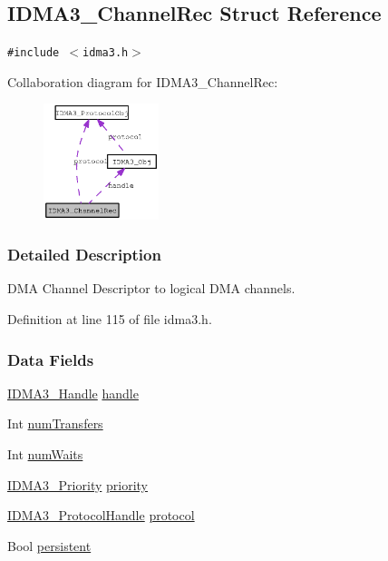 \hypertarget{struct_i_d_m_a3___channel_rec}{
\subsection{IDMA3\_\-Channel\-Rec Struct Reference}
\label{struct_i_d_m_a3___channel_rec}
}
{\tt \#include $<$idma3.h$>$}

Collaboration diagram for IDMA3\_\-Channel\-Rec:\begin{figure}[H]
\begin{center}
\leavevmode
\includegraphics[width=95pt]{struct_i_d_m_a3___channel_rec__coll__graph}
\end{center}
\end{figure}


\subsubsection{Detailed Description}
DMA Channel Descriptor to logical DMA channels. 



Definition at line 115 of file idma3.h.\subsubsection*{Data Fields}
\begin{CompactItemize}
\item 
\hyperlink{struct_i_d_m_a3___obj}{IDMA3\_\-Handle} \hyperlink{struct_i_d_m_a3___channel_rec_5632bb9719d49836987e3b4ae9b3d692}{handle}
\item 
Int \hyperlink{struct_i_d_m_a3___channel_rec_725990b773355d1dfd5fc9af66179d22}{num\-Transfers}
\item 
Int \hyperlink{struct_i_d_m_a3___channel_rec_9be5abbc86b57d28e1d65cc6ea1ed294}{num\-Waits}
\item 
\hyperlink{group___d_s_p_i_d_m_a3_gfa41dccd2cc8f94915fffdda2c8b4a59}{IDMA3\_\-Priority} \hyperlink{struct_i_d_m_a3___channel_rec_e8b3740a842ad7ebb28cecf135f0c88f}{priority}
\item 
\hyperlink{struct_i_d_m_a3___protocol_obj}{IDMA3\_\-Protocol\-Handle} \hyperlink{struct_i_d_m_a3___channel_rec_a7a4ff7549fd7be65a22cba0b8d50fad}{protocol}
\item 
Bool \hyperlink{struct_i_d_m_a3___channel_rec_c7a418727b547fe8f9d88f74f7d4c764}{persistent}
\end{CompactItemize}


